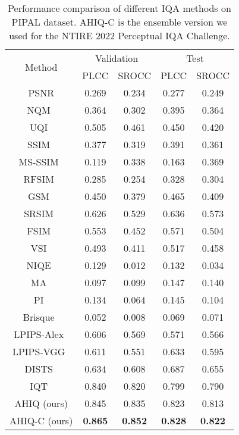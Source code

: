 \documentclass[10pt,twocolumn,letterpaper]{article}
\begin{document}
\begin{table}[th]
\centering
\caption{
Performance comparison of different IQA methods on PIPAL dataset. AHIQ-C is the ensemble version we used for the NTIRE 2022 Perceptual IQA Challenge.
}
\begin{tabular}{ccccc}
\toprule[1.2pt]
\multirow{2}{*}{Method} & \multicolumn{2}{c}{Validation} & \multicolumn{2}{c}{Test} \\ \cline{2-5} 
 & PLCC & SROCC & PLCC & SROCC \\ \hline
PSNR & 0.269 & 0.234 & 0.277 & 0.249 \\
NQM~\cite{damera2000image} & 0.364 & 0.302 & 0.395 & 0.364 \\
UQI~\cite{wang2002universal} & 0.505 & 0.461 & 0.450 & 0.420 \\
SSIM~\cite{wang2004image} & 0.377 & 0.319 & 0.391 & 0.361 \\
MS-SSIM~\cite{wang2003multiscale} & 0.119 & 0.338 & 0.163 & 0.369 \\
RFSIM~\cite{zhang2010rfsim} & 0.285 & 0.254 & 0.328 & 0.304 \\
GSM~\cite{liu2011image} & 0.450 & 0.379 & 0.465 & 0.409 \\
SRSIM~\cite{zhang2012sr} & 0.626 & 0.529 & 0.636 & 0.573 \\
FSIM~\cite{zhang2011fsim} & 0.553 & 0.452 & 0.571 & 0.504 \\
VSI~\cite{zhang2014vsi} & 0.493 & 0.411 & 0.517 & 0.458 \\
NIQE~\cite{mittal2012making} & 0.129 & 0.012 & 0.132 & 0.034 \\
MA~\cite{ma2017learning} & 0.097 & 0.099 & 0.147 & 0.140 \\
PI~\cite{blau2018perception} & 0.134 & 0.064 & 0.145 & 0.104 \\
Brisque~\cite{mittal2011blind} & 0.052 & 0.008 & 0.069 & 0.071 \\ \hline
LPIPS-Alex~\cite{zhang2018unreasonable} & 0.606 & 0.569 & 0.571 & 0.566 \\
LPIPS-VGG~\cite{zhang2018unreasonable} & 0.611 & 0.551 & 0.633 & 0.595 \\
DISTS~\cite{ding2020image} & 0.634 & 0.608 & 0.687 & 0.655 \\
IQT~\cite{cheon2021perceptual} & 0.840 & 0.820 & 0.799 & 0.790 \\ \hline
AHIQ (ours) & 0.845 & 0.835 & 0.823 & 0.813 \\
AHIQ-C (ours) & \textbf{0.865} & \textbf{0.852} & \textbf{0.828} & \textbf{0.822}  \\ \toprule[1.2pt]
\end{tabular}
\label{tab:pipal}
\end{table}
\end{document}
